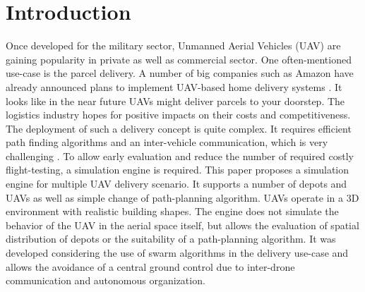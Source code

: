 \section{Introduction}
Once developed for the military sector, Unmanned Aerial Vehicles (UAV) are gaining popularity in private as well as commercial sector. One often-mentioned use-case is the parcel delivery. A number of big companies such as Amazon have already announced plans to implement UAV-based home delivery systems \cite{stolaroff.2014}. It looks like in the near future UAVs might deliver parcels to your doorstep. The logistics industry hopes for positive impacts on their costs and competitiveness. The deployment of such a delivery concept is quite complex. It requires efficient path finding algorithms and an inter-vehicle communication, which is very challenging \cite{bekmezci.2013}. To allow early evaluation and reduce the number of required costly flight-testing, a simulation engine is required. This paper proposes a simulation engine for multiple UAV delivery scenario. It supports a number of depots and UAVs as well as simple change of path-planning algorithm. UAVs operate in a 3D environment with realistic building shapes. The engine does not simulate the behavior of the UAV in the aerial space itself, but allows the evaluation of spatial distribution of depots or the suitability of a path-planning algorithm. It was developed considering the use of swarm algorithms in the delivery use-case and allows the avoidance of a central ground control due to inter-drone communication and autonomous organization.

